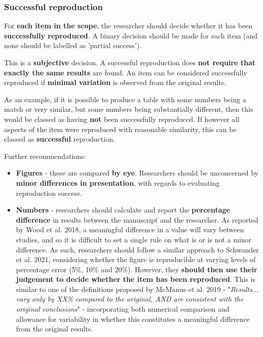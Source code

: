 \vspace{0.5cm}
\subsubsection{Successful reproduction}

For \textbf{each item in the scope}, the researcher should decide whether it has been \textbf{successfully reproduced}. A binary decision should be made for each item (and none should be labelled as 'partial success').

This is a \textbf{subjective} decision. A successful reproduction does \textbf{not require that exactly the same results} are found. An item can be considered successfully reproduced if \textbf{minimal variation} is observed from the original results.

As an example, if it is possible to produce a table with some numbers being a match or very similar, but some numbers being substantially different, then this would be classed as having \textbf{not} been successfully reproduced. If however all aspects of the item were reproduced with reasonable similarity, this can be classed as \textbf{successful} reproduction.

Further recommendations:
\begin{itemize}
    \item \textbf{Figures} - these are compared \textbf{by eye}. Researchers should be unconcerned by \textbf{minor differences in presentation}, with regards to evaluating reproduction success.
    \item \textbf{Numbers} - researchers should calculate and report the \textbf{percentage difference} in results between the manuscript and the researcher. As reported by Wood et al. 2018,\autocite{wood_push_2018, wood_replication_2018} a meaningful difference in a value will vary between studies, and so it is difficult to set a single rule on what is or is not a minor difference. As such, researchers should follow a similar approach to Schwander et al. 2021,\autocite{schwander_replication_2021} considering whether the figure is reproducible at varying levels of percentage error (5\%, 10\% and 20\%). However, they \textbf{should then use their judgement to decide whether the item has been reproduced}. This is similar to one of the definitions proposed by McManus et al. 2019\autocite{mcmanus_can_2019} - "\textit{Results... vary only by XX\% compared to the original, AND are consistent with the original conclusions}" - incorporating both numerical comparison and allowance for variability in whether this constitutes a meaningful difference from the original results.
\end{itemize}

